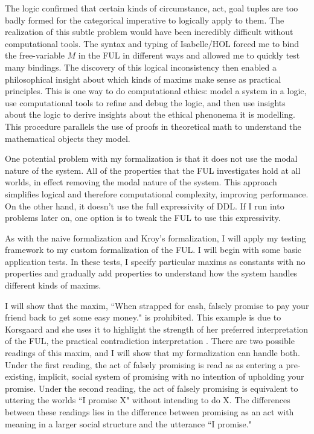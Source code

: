 \begin{isabellebody}
\begin{isamarkuptext}
The logic confirmed that certain kinds
of circumstance, act, goal tuples are too badly formed for the categorical imperative to logically 
apply to them. The realization of this subtle problem would have been incredibly difficult without 
computational tools. The syntax and typing of Isabelle/HOL forced me to bind the free-variable $M$
in the FUL in different ways and allowed me to quickly test many bindings. The discovery of this 
logical inconsistency then enabled a philosophical insight about which kinds of maxims make sense as 
practical principles. This is one way to do computational ethics: model a system in a logic, use 
computational tools to refine and debug the logic, and then use insights about the logic to derive 
insights about the ethical phenonema it is modelling. This procedure parallels the use of proofs in 
theoretical math to understand the mathematical objects they model.%
\end{isamarkuptext}\isamarkuptrue%
%
\begin{isamarkuptext}%
One potential problem with my formalization is that it does not use the modal nature of the system. 
All of the properties that the FUL investigates hold at all worlds, in effect removing the modal nature 
of the system. This approach simplifies logical and therefore computational complexity, improving 
performance. On the other hand, it doesn't use the full expressivity of DDL. If I run into problems 
later on, one option is to tweak the FUL to use this expressivity.%
\end{isamarkuptext}\isamarkuptrue%
%
\isadelimdocument
%
\endisadelimdocument
%
\isatagdocument
%
\isamarkuptrue%
%
\endisatagdocument
{\isafolddocument}%
%
\isadelimdocument
%
\endisadelimdocument
%
\begin{isamarkuptext}%
As with the naive formalization and Kroy's formalization, I will apply my testing framework to 
my custom formalization of the FUL. I will begin with some basic application tests. In these tests, 
I specify particular maxims as constants with no properties and gradually add properties to understand 
how the system handles different kinds of maxims.%
\end{isamarkuptext}\isamarkuptrue%
%
\begin{isamarkuptext}%
I will show that the maxim, ``When strapped for cash, falsely promise to pay your friend back
to get some easy money." is prohibited. This example is due to Korsgaard and she uses it to highlight 
the strength of her preferred interpretation of the FUL, the practical contradiction interpretation \cite{KorsgaardFUL}.
There are two possible readings of this maxim, and I will show that my formalization can handle both. 
Under the first reading, the act of falsely promising is read as
as entering a pre-existing, implicit, social system of promising with no intention of upholding your 
promise. Under the second reading, the act of falsely promising is equivalent to uttering the worlds 
``I promise X" without intending to do X. The differences between these readings lies in the difference 
between promising as an act with meaning in a larger social structure and the utterance ``I promise."


\end{isamarkuptext}
\end{isabellebody}
